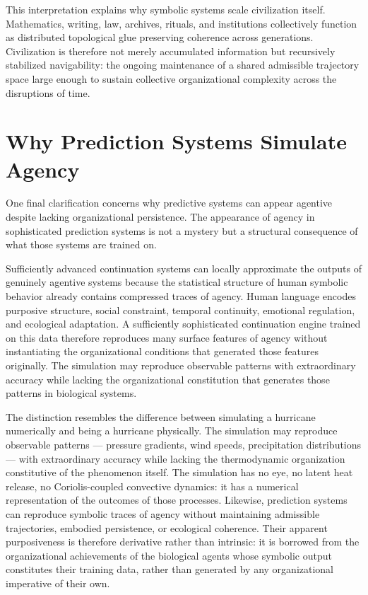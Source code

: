 \documentclass[12pt,a4paper]{report}
\theoremstyle{flyxion}
\begin{document}
This interpretation explains why symbolic systems scale civilization itself. Mathematics, writing, law, archives, rituals, and institutions collectively function as distributed topological glue preserving coherence across generations. Civilization is therefore not merely accumulated information but recursively stabilized navigability: the ongoing maintenance of a shared admissible trajectory space large enough to sustain collective organizational complexity across the disruptions of time.

\section{Why Prediction Systems Simulate Agency}

One final clarification concerns why predictive systems can appear agentive despite lacking organizational persistence. The appearance of agency in sophisticated prediction systems is not a mystery but a structural consequence of what those systems are trained on.

Sufficiently advanced continuation systems can locally approximate the outputs of genuinely agentive systems because the statistical structure of human symbolic behavior already contains compressed traces of agency. Human language encodes purposive structure, social constraint, temporal continuity, emotional regulation, and ecological adaptation. A sufficiently sophisticated continuation engine trained on this data therefore reproduces many surface features of agency without instantiating the organizational conditions that generated those features originally. The simulation may reproduce observable patterns with extraordinary accuracy while lacking the organizational constitution that generates those patterns in biological systems.

The distinction resembles the difference between simulating a hurricane numerically and being a hurricane physically. The simulation may reproduce observable patterns --- pressure gradients, wind speeds, precipitation distributions --- with extraordinary accuracy while lacking the thermodynamic organization constitutive of the phenomenon itself. The simulation has no eye, no latent heat release, no Coriolis-coupled convective dynamics: it has a numerical representation of the outcomes of those processes. Likewise, prediction systems can reproduce symbolic traces of agency without maintaining admissible trajectories, embodied persistence, or ecological coherence. Their apparent purposiveness is therefore derivative rather than intrinsic: it is borrowed from the organizational achievements of the biological agents whose symbolic output constitutes their training data, rather than generated by any organizational imperative of their own.
\end{document}
